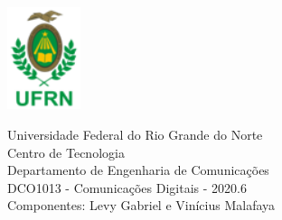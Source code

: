 \documentclass[12pt]{article}
\newcommand{\hoofding}[6]{ 
\begin{flushleft}
\includegraphics[height=3cm]{images/ufrn.png} 
\end{flushleft}
\vspace{-3.3cm} 
\hspace{3cm} 
\parbox{10cm}{#1\\#2\\#3\\#4\\#5\\#6} 
\vspace{-0.6cm}
\hspace{1cm}   

{\parindent=0pt \hrulefill} 
\vspace{0mm}}
\begin{document}
\hoofding {Universidade Federal do Rio Grande do Norte}{Centro de Tecnologia}{Departamento de Engenharia de Comunicações}{DCO1013 - Comunicações Digitais - 2020.6}{Componentes: Levy Gabriel e Vinícius Malafaya}

\onehalfspacing 


\end{document}
